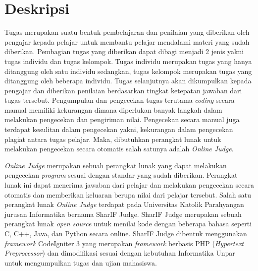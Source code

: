 \documentclass[a4paper,twoside]{article}
\begin{document}
\title{\@judultopik}
\author{\nama \textendash \@npm} 

\newcommand{\nama}{Filipus}
\newcommand{\@npm}{6181901074}
\newcommand{\@judultopik}{Konversi SharIF Judge dari CodeIgniter 3 ke CodeIgniter 4} %
\newcommand{\jumpemb}{1} %
\newcommand{\tanggal}{22/02/2023}


\maketitle


\section{Deskripsi}
Tugas merupakan suatu bentuk pembelajaran dan penilaian yang diberikan oleh pengajar kepada pelajar untuk membantu pelajar mendalami materi yang sudah diberikan. Pembagian tugas yang diberikan dapat dibagi menjadi 2 jenis yakni tugas individu dan tugas kelompok. Tugas individu merupakan tugas yang hanya ditanggung oleh satu individu sedangkan, tugas kelompok merupakan tugas yang ditanggung oleh beberapa individu. Tugas selanjutnya akan dikumpulkan kepada pengajar dan diberikan penilaian berdasarkan tingkat ketepatan jawaban dari tugas tersebut. Pengumpulan dan pengecekan tugas terutama \textit{coding} secara manual memiliki kekurangan dimana diperlukan banyak langkah dalam melakukan pengecekan dan pengiriman nilai. Pengecekan secara manual juga terdapat kesulitan dalam pengecekan yakni, kekurangan dalam pengecekan plagiat antara tugas pelajar. Maka, dibutuhkan perangkat lunak untuk melakukan pengecekan secara otomatis salah satunya adalah \textit{Online Judge}.

\textit{Online Judge} merupakan sebuah perangkat lunak yang dapat melakukan pengecekan \textit{program} sesuai dengan standar yang sudah diberikan. Perangkat lunak ini dapat menerima jawaban dari pelajar dan melakukan pengecekan secara otomatis dan memberikan keluaran berupa nilai dari pelajar tersebut\cite{kurnia:01:judge}. Salah satu perangkat lunak \textit{Online Judge} terdapat pada Universitas Katolik Parahyangan jurusan Informatika bernama SharIF Judge. SharIF Judge merupakan sebuah perangkat lunak \textit{open source} untuk menilai kode dengan beberapa bahasa seperti C, C++, Java, dan Python secara online. SharIF Judge dibentuk menggunakan \textit{framework} CodeIgniter 3 yang merupakan \textit{framework} berbasis PHP (\textit{Hypertext Preprocessor}) dan dimodifikasi sesuai dengan kebutuhan Informatika Unpar untuk mengumpulkan tugas dan ujian mahasiswa.
\end{document}
